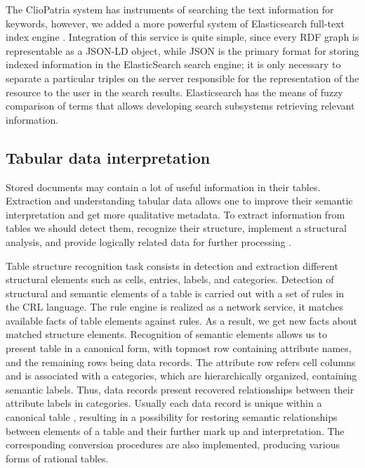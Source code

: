 \documentclass[conference,a4paper]{IEEEtran}
\begin{document}
The ClioPatria system has instruments of searching the text information for keywords, however, we added a more powerful system of Elasticsearch full-text index engine \cite{b13}.  Integration of this service is quite simple, since every RDF graph is representable as a JSON-LD object, while JSON is the primary format for storing indexed information in the ElasticSearch search engine; it is only necessary to separate a particular triples on the server responsible for the representation of the resource to the user in the search results.  Elasticsearch has the means of fuzzy comparison of terms that allows developing search subsystems retrieving relevant information.


\subsection{Tabular data interpretation}

Stored documents may contain a lot of useful information in their tables.  Extraction and understanding tabular data allows one to improve their semantic interpretation and get more qualitative metadata.  To extract information from tables we should detect them, recognize their structure, implement a structural analysis, and provide logically related data for further processing \cite{Shigarov_2017}.

Table structure recognition task consists in detection and extraction different structural elements such as cells, entries, labels, and categories.  Detection of structural and semantic elements of a table is carried out with a set of rules in the CRL language.  The rule engine is realized as a network service, it matches available facts of table elements against rules.  As a result, we get new facts about matched structure elements.  Recognition of semantic elements allows us to present table in a canonical form, with topmost row containing attribute names, and the remaining rows being data records.  The attribute row refers cell columns and is associated with a categories, which are hierarchically organized, containing semantic labels.  Thus, data records present recovered relationships between their attribute labels in  categories.  Usually each data record is unique within a canonical table \cite{Shigarov_2016}, resulting in a possibility for restoring semantic relationships between elements of a table and their further mark up and interpretation.  The corresponding conversion procedures are also implemented, producing various forms of rational tables.
\end{document}
